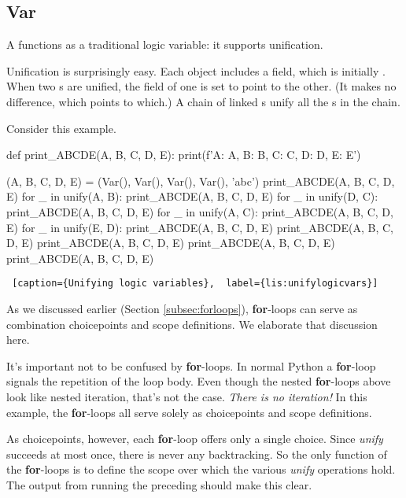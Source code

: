 \subsection{Var} \label{subsec:var}
A  functions as a traditional logic variable: it supports unification. 

Unification is surprisingly easy. Each  object includes a  field, which is initially . When two s are unified, the  field of one is set to point to the other. (It makes no difference, which points to which.) A chain of linked  s unify all the s in the chain. 

Consider this example.

\begin{minipage}{\linewidth} \largev   \hrulefill
\begin{python}[numbers=left]
def print_ABCDE(A, B, C, D, E):
    print(f'A: {A}, B: {B}, C: {C}, D: {D}, E: {E}')

(A, B, C, D, E) = (Var(), Var(), Var(), Var(), 'abc')
print_ABCDE(A, B, C, D, E) 
for _ in unify(A, B):
  print_ABCDE(A, B, C, D, E) 
  for _ in unify(D, C):
    print_ABCDE(A, B, C, D, E) 
    for _ in unify(A, C):
      print_ABCDE(A, B, C, D, E) 
      for _ in unify(E, D):
        print_ABCDE(A, B, C, D, E) 
      print_ABCDE(A, B, C, D, E) 
    print_ABCDE(A, B, C, D, E) 
  print_ABCDE(A, B, C, D, E) 
print_ABCDE(A, B, C, D, E) 
\end{python}
\begin{lstlisting} [caption={Unifying logic variables},  label={lis:unifylogicvars}]
\end{lstlisting}
\end{minipage}

As we discussed earlier (Section \ref{subsec:forloops}), \textbf{for}-loops can serve as combination choicepoints and scope definitions. We elaborate that discussion here.

It's important not to be confused by \textbf{for}-loops. In normal Python a \textbf{for}-loop signals the repetition of the loop body. Even though the nested \textbf{for}-loops above look like nested iteration, that's not the case. \textit{There is no iteration!} In this example, the \textbf{for}-loops all serve solely as choicepoints and scope definitions. 

As choicepoints, however, each \textbf{for}-loop offers only a single choice. Since  \textit{unify} succeeds at most once, there is never any backtracking. So the only function of the \textbf{for}-loops is to define the scope over which the various \textit{unify} operations hold.  The output from running the preceding should make this clear.

